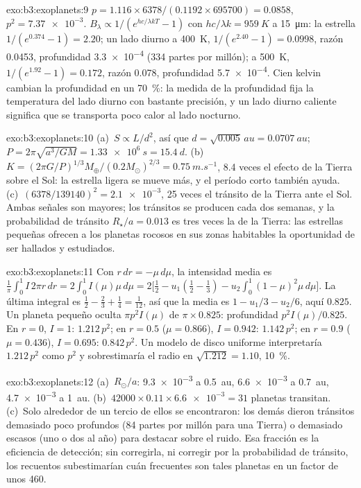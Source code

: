 \begin{solution}{exo:b3:exoplanets:9}
$p = 1.116\times6378/(0.1192\times695700) = 0.0858$, $p^2 = \num{7.37e-3}$.
$B_\lambda \propto 1/(e^{hc/\lambda kT} - 1)$ con $hc/\lambda k =
\qty{959}{K}$ a \qty{15}{\micro m}: la estrella $1/(e^{0.374} - 1) = 2.20$;
un lado diurno a \qty{400}{K}, $1/(e^{2.40} - 1) = 0.0998$, razón \num{0.0453},
profundidad \num{3.3e-4} (334 partes por millón); a \qty{500}{K}, $1/(e^{1.92} -
1) = 0.172$, razón \num{0.078}, profundidad \num{5.7e-4}. Cien kelvin
cambian la profundidad en un \qty{70}{\percent}: la medida de la profundidad fija la
temperatura del lado diurno con bastante precisión, y un lado diurno caliente significa que
se transporta poco calor al lado nocturno.
\end{solution}

\begin{solution}{exo:b3:exoplanets:10}
(a)~$S \propto L/d^2$, así que $d = \sqrt{0.005}\,\unit{au} = \qty{0.0707}{au}$;
$P = 2\pi\sqrt{a^3/GM} = \qty{1.33e6}{s} = \qty{15.4}{d}$.
(b)~$K = (2\pi G/P)^{1/3}M_\oplus/(0.2M_\odot)^{2/3} = \qty{0.75}{m.s^{-1}}$,
8.4 veces el efecto de la Tierra sobre el Sol: la estrella ligera se mueve más, y
el período corto también ayuda. (c)~$(6378/139140)^2 = \num{2.1e-3}$, 25 veces
el tránsito de la Tierra ante el Sol. Ambas señales son mayores; los tránsitos
se producen cada dos semanas, y la probabilidad de tránsito $R_\star/a =
\num{0.013}$ es tres veces la de la Tierra: las estrellas pequeñas ofrecen a los planetas rocosos en
sus zonas habitables la oportunidad de ser hallados y estudiados.
\end{solution}

\begin{solution}{exo:b3:exoplanets:11}
Con $r\,dr = -\mu\,d\mu$, la intensidad media es $\frac1\pi\int_0^1
I\,2\pi r\,dr = 2\int_0^1 I(\mu)\mu\,d\mu = 2\bigl[\tfrac12 - u_1(\tfrac12 -
\tfrac13) - u_2\int_0^1(1 - \mu)^2\mu\,d\mu\bigr]$. La última integral es
$\tfrac12 - \tfrac23 + \tfrac14 = \tfrac1{12}$, así que la media es $1 - u_1/3 -
u_2/6$, aquí $0.825$. Un planeta pequeño oculta $\pi p^2 I(\mu)$ de $\pi\times
0.825$: profundidad $p^2 I(\mu)/0.825$. En $r = 0$, $I = 1$: $1.212\,p^2$; en
$r = 0.5$ ($\mu = 0.866$), $I = 0.942$: $1.142\,p^2$; en $r = 0.9$ ($\mu =
0.436$), $I = 0.695$: $0.842\,p^2$. Un modelo de disco uniforme interpretaría
$1.212\,p^2$ como $p^2$ y sobrestimaría el radio en $\sqrt{1.212} = 1.10$,
\qty{10}{\percent}.
\end{solution}

\begin{solution}{exo:b3:exoplanets:12}
(a)~$R_\odot/a$: \num{9.3e-3} a \qty{0.5}{au}, \num{6.6e-3} a
\qty{0.7}{au}, \num{4.7e-3} a \qty{1}{au}. (b)~$42000\times0.11\times
\num{6.6e-3} = 31$ planetas transitan. (c)~Solo alrededor de un tercio de ellos
se encontraron: los demás dieron tránsitos demasiado poco profundos (84 partes por millón para
una Tierra) o demasiado escasos (uno o dos al año) para destacar sobre el ruido. Esa
fracción es la eficiencia de detección; sin corregirla, ni corregir por
la probabilidad de tránsito, los recuentos subestimarían cuán frecuentes son tales
planetas en un factor de unos 460.
\end{solution}

